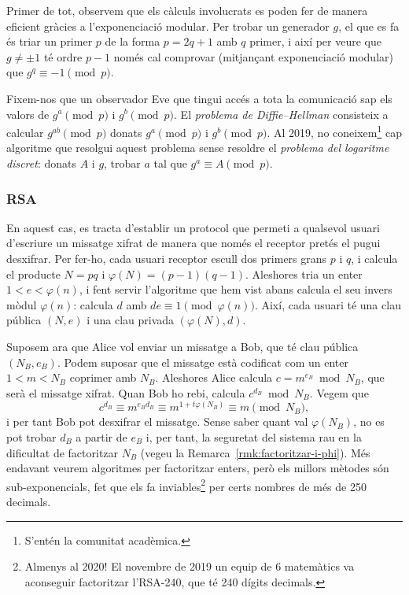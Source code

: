 Primer de tot, observem que els càlculs involucrats es poden fer de manera eficient gràcies a l'exponenciació modular. Per trobar un generador $g$, el que es fa és triar un primer $p$ de la forma $p=2q+1$ amb $q$ primer, i així per veure que $g\neq \pm 1$ té ordre $p-1$ només cal comprovar (mitjançant exponenciació modular) que $g^q\equiv -1\pmod{p}$.

Fixem-nos que un observador Eve que tingui accés a tota la comunicació sap els valors de $g^a\pmod{p}$ i $g^b\pmod{p}$. El \emph{problema de Diffie--Hellman} consisteix a calcular $g^{ab}\pmod{p}$ donats $g^a\pmod{p}$ i $g^b\pmod{p}$. Al 2019, no coneixem\footnote{S'entén la comunitat acadèmica.} cap algoritme que resolgui aquest problema sense resoldre el \emph{problema del logaritme discret}: donats $A$ i $g$, trobar $a$ tal que $g^a\equiv A\pmod{p}$.

\subsubsection{RSA}
En aquest cas, es tracta d'establir un protocol que permeti a qualsevol usuari d'escriure un missatge xifrat de manera que només el receptor pretés el pugui desxifrar. Per fer-ho, cada usuari receptor escull dos primers grans $p$ i $q$, i calcula el producte $N=pq$ i $\varphi(N)=(p-1)(q-1)$. Aleshores tria un enter $1<e<\varphi(n)$, i fent servir l'algoritme que hem vist abans calcula el seu invers mòdul $\varphi(n)$: calcula $d$ amb $de\equiv 1\pmod{\varphi(n)}$. Així, cada usuari té una clau pública $(N,e)$ i una clau privada $(\varphi(N),d)$.

Suposem ara que Alice vol enviar un missatge a Bob, que té clau pública $(N_B,e_B)$. Podem suposar que el missatge està codificat com un enter $1<m<N_B$ coprimer amb $N_B$. Aleshores Alice calcula $c=m^{e_B}\bmod{N_B}$, que serà el missatge xifrat. Quan Bob ho rebi, calcula $c^{d_B}\bmod{N_B}$. Vegem que
\[
c^{d_B}\equiv m^{e_Bd_B}\equiv m^{1+t\varphi(N_B)}\equiv m\pmod{N_B},
\]
i per tant Bob pot desxifrar el missatge. Sense saber quant val $\varphi(N_B)$, no es pot trobar $d_B$ a partir de $e_B$ i, per tant, la seguretat del sistema rau en la dificultat de factoritzar $N_B$ (vegeu la Remarca~\ref{rmk:factoritzar-i-phi}). Més endavant veurem algoritmes per factoritzar enters, però els millors mètodes són sub-exponencials, fet que els fa inviables\footnote{Almenys al 2020! El novembre de 2019 un equip de 6 matemàtics va aconseguir factoritzar l'RSA-240, que té 240 dígits decimals.} per certs nombres de més de 250 decimals.  